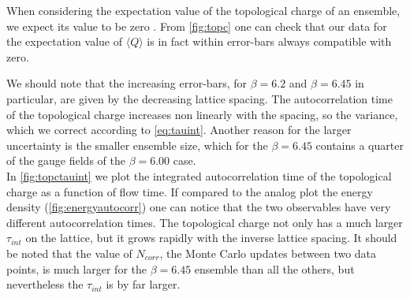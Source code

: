 When considering the expectation value of the topological charge of an ensemble, we expect its value to be zero \cite{ce_non-gaussianities_2015}. From \cref{fig:topc} one can check that our data for the expectation value of $\langle Q\rangle$ is in fact within error-bars always compatible with zero. 

We should note that the increasing error-bars, for $\beta = 6.2$ and $\beta = 6.45$ in particular, are given by the decreasing lattice spacing. The autocorrelation time of the topological charge increases non linearly with the spacing, so the variance, which we correct according to \cref{eq:tauint}. Another reason for the larger uncertainty is the smaller ensemble size, which for the $\beta = 6.45$ contains a quarter of the gauge fields of the  $\beta=6.00$  case. \\
In \cref{fig:topctauint} we plot the integrated autocorrelation time of the topological charge as a function of flow time. If compared to the analog plot the energy density (\cref{fig:energyautocorr}) one can notice that the two observables have very different autocorrelation times. The topological charge not only has a much larger $\tau_{int}$ on the lattice, but it grows rapidly with the inverse lattice spacing. It should be noted that the value of $N_{corr}$, the Monte Carlo updates between two data points, is much larger for the $\beta=6.45$ ensemble than all the others, but nevertheless the $\tau_{int}$ is by far larger.

